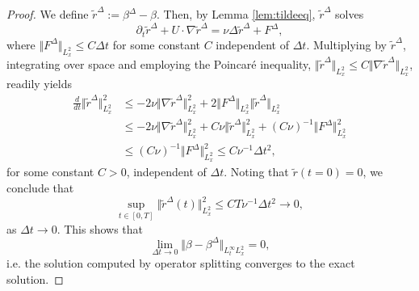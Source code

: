 \documentclass[reqno,12pt]{amsart}
\renewcommand{\tilde}{\widetilde}
\begin{document}
\begin{proof}
We define $\tilde{r}^\Delta := {\beta}^\Delta - \beta$. Then, by Lemma \ref{lem:tildeeq}, $\tilde{r}^\Delta$ solves
\[
\partial_t \tilde{r}^\Delta
+
U \cdot \nabla \tilde{r}^\Delta
=
\nu \Delta \tilde{r}^\Delta
+
F^\Delta,
\]
where $\Vert F^\Delta \Vert_{L^2_x} \le C\Delta t$ for some constant $C$ independent of $\Delta t$. Multiplying by $\tilde{r}^\Delta$, integrating over space and employing the Poincar\'e inequality, $\Vert \tilde{r}^\Delta \Vert_{L^2_x} \le C\Vert \nabla \tilde{r}^\Delta \Vert_{L^2_x} $, readily yields
\begin{align*}
\frac{d}{dt} \Vert \tilde{r}^\Delta \Vert_{L^2_x}^2
&\le
-2\nu \Vert \nabla \tilde{r}^\Delta \Vert_{L^2_x}^2 + 2\Vert F^\Delta \Vert_{L^2_x} \Vert \tilde{r}^\Delta \Vert_{L^2_x}
\\
&\le
-2\nu \Vert \nabla \tilde{r}^\Delta \Vert_{L^2_x}^2 + C\nu \Vert \tilde{r}^\Delta \Vert_{L^2_x}^2 + (C\nu)^{-1} \Vert F^\Delta \Vert_{L^2_x}^2
\\
&\le
(C\nu)^{-1} \Vert F^\Delta\Vert_{L^2_x}^2
\le
C\nu^{-1} \Delta t^2,
\end{align*}
for some constant $C>0$, independent of $\Delta t$. Noting that $\tilde{r}(t=0) = 0$, we conclude that
\[
\sup_{t\in [0,T]} \Vert \tilde{r}^\Delta(t) \Vert_{L^2_x}^2
\le
CT\nu^{-1} \Delta t^2
\to 0,
\]
as $\Delta t\to 0$. This shows that
\[
\lim_{\Delta t\to 0} \Vert \beta - {\beta}^\Delta \Vert_{L^\infty_t L^2_x} = 0,
\]
i.e. the solution computed by operator splitting converges to the exact solution.
\end{proof}




{}

\end{document}
